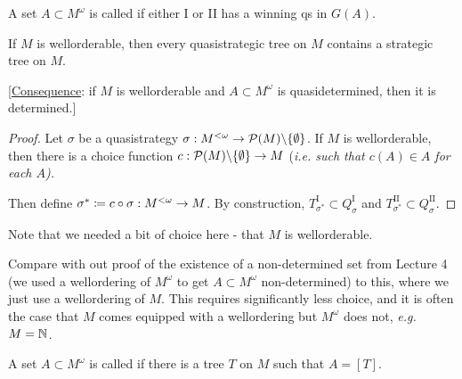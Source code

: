 \documentclass[]{article}
\newcommand{\I}{\textrm{I}}
\newcommand{\II}{\textrm{II}}
\newcommand{\om}{\omega}
\newcommand{\lom}{{<\omega}}
\begin{document}
\begin{defin*}
    A set $A\subset M^\om$ is called  if either I or II has a winning qs in $G(A)$.
\end{defin*}

\begin{remark*}[Lemma]
    If $M$ is wellorderable, then every quasistrategic tree on $M$ contains a strategic tree on $M$.
\end{remark*}

[\underline{Consequence}: if $M$ is wellorderable and $A\subset M^\om$ is quasidetermined, then it is determined.]

\begin{proof}
    Let $\sigma$ be a quasistrategy $\sigma :M^\lom \ra \mathcal{P}(M)\backslash \{\emptyset\}$. If $M$ is wellorderable, then there is a choice function $c:\mathcal{P}(M)\backslash \{\emptyset\}\rightarrow M$ (\it{i.e.} such that $c(A)\in A$ for each $A$).

    Then define $\sigma^\ast \coloneqq c\circ \sigma:M^\lom \ra M$. By construction, $T_{\sigma^\ast}^\I \subset Q_\sigma^\I$ and $T_{\sigma^\ast}^\II \subset Q_\sigma^\II$.
\end{proof}

Note that we needed a bit of choice here - that $M$ is wellorderable.

Compare with out proof of the existence of a non-determined set from Lecture 4 (we used a wellordering of $M^\om$ to get $A\subset M^\om$ non-determined) to this, where we just use a wellordering of $M$. This requires significantly less choice, and it is often the case that $M$ comes equipped with a wellordering but $M^\om$ does not, \it{e.g.} $M = \mathbb{N}$.

\begin{defin*}
    A set $A\subset M^\om$ is called  if there is a tree $T$ on $M$ such that $A = [T]$.
\end{defin*}
\end{document}
